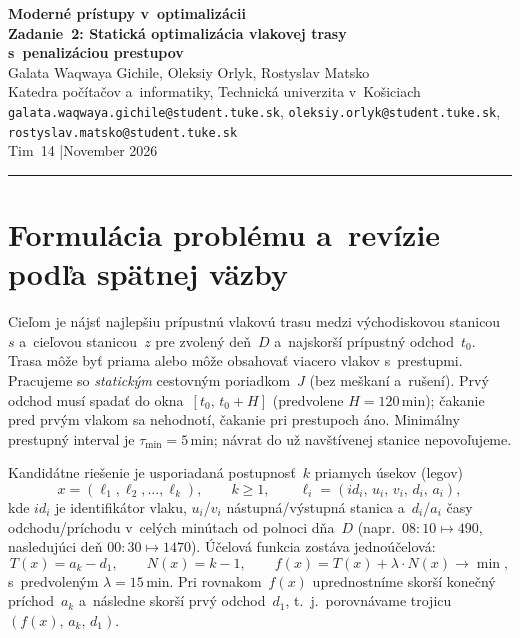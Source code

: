 \documentclass[11pt,a4paper]{article}
\begin{document}
\begin{center}
  {\large\bfseries Moderné prístupy v~optimalizácii}\\[0.35em]
  {\bfseries Zadanie~2: Statická optimalizácia vlakovej trasy\\
  s~penalizáciou prestupov}\\[0.55em]
  {\small
  Galata Waqwaya Gichile, Oleksiy Orlyk, Rostyslav Matsko\\[0.2em]
  Katedra počítačov a~informatiky, Technická univerzita v~Košiciach\\[0.2em]
  \texttt{galata.waqwaya.gichile@student.tuke.sk},
  \texttt{oleksiy.orlyk@student.tuke.sk},
  \texttt{rostyslav.matsko@student.tuke.sk}\\[0.25em]
  Tim~14 \quad|\quad November 2026
  }
\end{center}
\vspace{0.35em}
\hrule
\vspace{0.55em}

\section{Formulácia problému a~revízie podľa spätnej väzby}

Cieľom je nájsť najlepšiu prípustnú vlakovú trasu medzi východiskovou stanicou~$s$
a~cieľovou stanicou~$z$ pre zvolený deň~$D$ a~najskorší prípustný odchod~$t_0$.
Trasa môže byť priama alebo môže obsahovať viacero vlakov s~prestupmi.
Pracujeme so \emph{statickým} cestovným poriadkom~$J$ (bez meškaní a~rušení).
Prvý odchod musí spadať do okna~$[t_0,\,t_0+H]$ (predvolene $H=120$\,min);
čakanie pred prvým vlakom sa nehodnotí, čakanie pri prestupoch áno.
Minimálny prestupný interval je $\tau_{\min}=5$\,min; návrat do už navštívenej
stanice nepovoľujeme.

Kandidátne riešenie je usporiadaná postupnosť~$k$ priamych úsekov (legov)
\begin{equation}
  x=(\ell_1,\ell_2,\ldots,\ell_k),\qquad
  k\ge 1,\qquad
  \ell_i=(id_i,\,u_i,\,v_i,\,d_i,\,a_i),
\end{equation}
kde $id_i$ je identifikátor vlaku, $u_i$/$v_i$ nástupná/výstupná stanica
a~$d_i$/$a_i$ časy odchodu/príchodu v~celých minútach od polnoci dňa~$D$
(napr.\ $08{:}10\mapsto 490$, nasledujúci deň $00{:}30\mapsto 1470$).
Účelová funkcia zostáva jednoúčelová:
\begin{equation}
  T(x)=a_k-d_1,\qquad
  N(x)=k-1,\qquad
  f(x)=T(x)+\lambda\cdot N(x)\to\min,
\end{equation}
s~predvoleným $\lambda=15$\,min. Pri rovnakom~$f(x)$ uprednostníme skorší
konečný príchod~$a_k$ a~následne skorší prvý odchod~$d_1$, t.\ j.\ porovnávame
trojicu $(f(x),\,a_k,\,d_1)$.
\end{document}
